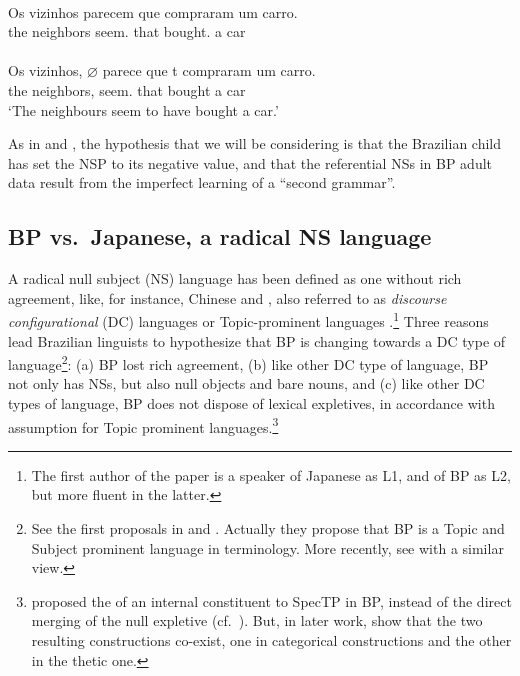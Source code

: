\documentclass[output=paper]{langsci/langscibook}
\begin{document}
\ea%
    \label{ex:26.25}
    \ea     \textcite{MartinsNunes2009}\\
	\gll	Os vizinhos    parecem    que compraram um carro.\\
            the neighbors seem.\Tpl{} that bought.\Tpl{}  a car\\
    \ex     \textcite{MartinsNunes2005}\\
	\gll	Os vizinhos, \textbf{$\varnothing$}\textbf{} parece     que t compraram um carro.\\
            the neighbors, {} seem.\Tsg{}    that {} bought        a car\\
	\glt	\enquote*{The neighbours seem to have bought a car.}

    \z
\z

As in \citet{MartinsNunes2009} and \citet{Kato2011}, the hypothesis that we
will be considering is that the Brazilian child has set the \gls{NSP} to its
negative value, and that the referential NSs in \gls{BP} adult data result from the imperfect learning of a “second
grammar”.

\subsection{BP vs.\ Japanese, a radical NS language}\label{sec:26.3.2}\largerpage

A radical null subject (NS) language has been defined as one without rich
agreement, like, for instance, Chinese and , also referred
to as \emph{discourse configurational} (DC) languages
\parencite{EKiss1995,Miyagawa2010} or Topic-prominent languages
\parencite{LiThompson1976}.\footnote{The first author of the paper is a speaker
of Japanese as L1, and of \gls{BP} as L2, but more
fluent in the latter.} Three reasons lead Brazilian linguists to hypothesize
that \gls{BP} is changing towards a DC type of
language\footnote{See the first  proposals in \citet{Pontes1987} and
    \citet{Kato1989}.  Actually they propose that \gls{BP} is a Topic and Subject prominent language in
 terminology.   More recently, see
\citet{NegraoViotti2000,Modesto2008} with a similar view.}: (a)
\gls{BP} lost rich agreement,  (b) like other DC type
of language, \gls{BP} not only has NSs, but also null
objects and bare nouns, and (c) like other DC types of language,
\gls{BP} does not dispose of lexical expletives, in
accordance with  assumption for Topic prominent
languages.\footnote{\textcite{KatoDuarte2014a} proposed the  of an
    internal constituent to SpecTP in \gls{BP}, instead of the direct merging
    of the null expletive (cf.\ \citealt{Chomsky2004}). But, in later work,
\textcite{KatoDuarte2014b} show that the two resulting constructions co-exist,
one in categorical constructions and the other in the thetic one.}
\end{document}
